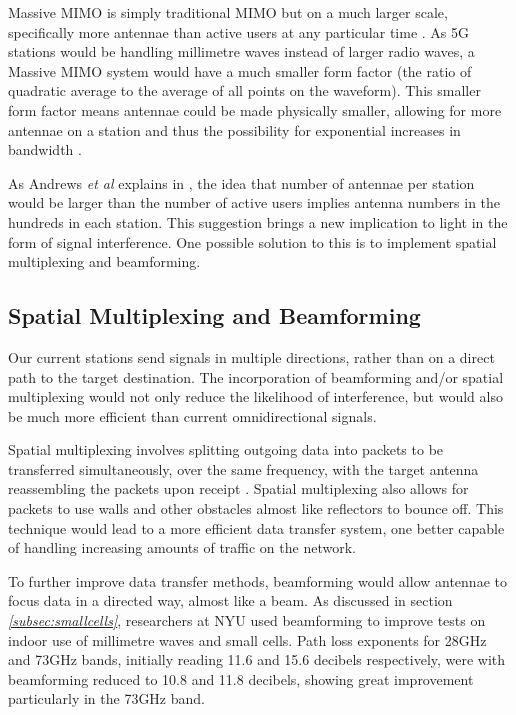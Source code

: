 \documentclass[journal]{IEEEtran}
\begin{document}
Massive MIMO is simply traditional MIMO but on a much larger scale, specifically more antennae than active users at any particular time \cite{whatwill5gbe}. As 5G stations would be handling millimetre waves instead of larger radio waves, a Massive MIMO system would have a much smaller form factor (the ratio of quadratic average to the average of all points on the waveform). This smaller form factor means antennae could be made physically smaller, allowing for more antennae on a station and thus the possibility for exponential increases in bandwidth \cite{mimo}.

As Andrews \textit{et al} explains in \cite{whatwill5gbe}, the idea that number of antennae per station would be larger than the number of active users implies antenna numbers in the hundreds in each station. This suggestion brings a new implication to light in the form of signal interference. One possible solution to this is to implement spatial multiplexing and beamforming.

\subsection{Spatial Multiplexing and Beamforming}\label{subsec:beamspac}
Our current stations send signals in multiple directions, rather than on a direct path to the target destination. The incorporation of beamforming and/or spatial multiplexing would not only reduce the likelihood of interference, but would also be much more efficient than current omnidirectional signals.

Spatial multiplexing involves splitting outgoing data into packets to be transferred simultaneously, over the same frequency, with the target antenna reassembling the packets upon receipt \cite{beam_sm}. Spatial multiplexing also allows for packets to use walls and other obstacles almost like reflectors to bounce off. This technique would lead to a more efficient data transfer system, one better capable of handling increasing amounts of traffic on the network.

To further improve data transfer methods, beamforming would allow antennae to focus data in a directed way, almost like a beam. As discussed in section \textit{\ref{subsec:smallcells}}, researchers at NYU used beamforming to improve tests on indoor use of millimetre waves and small cells. Path loss exponents for 28GHz and 73GHz bands, initially reading 11.6 and 15.6 decibels respectively, were with beamforming reduced to 10.8 and 11.8 decibels, showing great improvement particularly in the 73GHz band.
\end{document}
